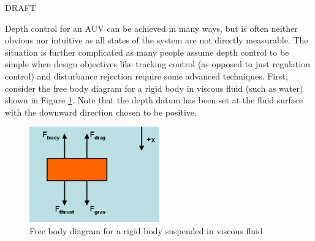 \documentclass{article}
\begin{document}
\maketitle

\begin{center}
\Huge 
DRAFT
\normalsize
\end{center}
\vspace{0.5cm}

Depth control for an AUV can be achieved in many ways, but is often neither obvious nor intuitive as all states of the system are not directly measurable.  The situation is further complicated as many people assume depth control to be simple when design objectives like tracking control (as opposed to just regulation control) and disturbance rejection require some advanced techniques.  First, consider the free body diagram for a rigid body in viscous fluid (such as water) shown in Figure \ref{fig:freeBody}.  Note that the depth datum has been set at the fluid surface with the downward direction chosen to be positive.

\begin{figure}[h]
\includegraphics[width=0.5\textwidth]{FreeBodyDiagram.png}
\centering
\caption{Free body diagram for a rigid body suspended in viscous fluid}\label{fig:freeBody}
\end{figure}
\end{document}
